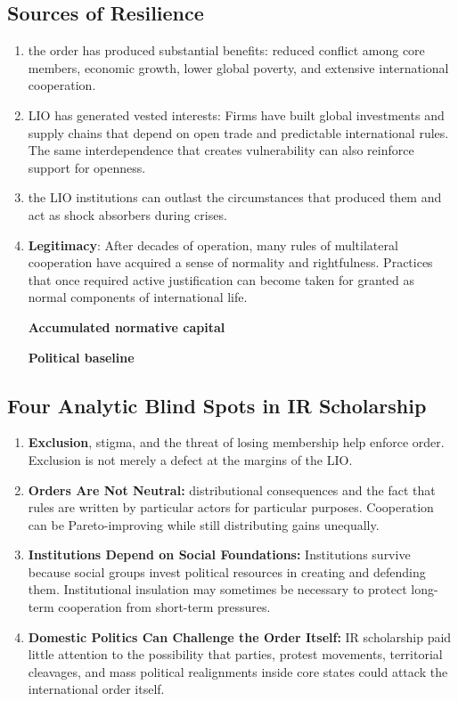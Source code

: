 \subsection{Sources of Resilience}

\begin{enumerate}
    \item the order has produced substantial benefits: reduced conflict among core members, economic growth, lower global poverty, and extensive international cooperation.
    \item LIO has generated vested interests: Firms have built global investments and supply chains that depend on open trade and predictable international rules. The same interdependence that creates vulnerability can also reinforce support for openness.
    \item the LIO institutions can outlast the circumstances that produced them and act as shock absorbers during crises.
    \item \textbf{Legitimacy}: After decades of operation, many rules of multilateral cooperation have acquired a sense of normality and rightfulness. Practices that once required active justification can become taken for granted as normal components of international life.
    
    \textbf{Accumulated normative capital}
    
    \textbf{Political baseline}
\end{enumerate}

\subsection{Four Analytic Blind Spots in IR Scholarship}

\begin{enumerate}
    \item \textbf{Exclusion}, stigma, and the threat of losing membership help enforce order. Exclusion is not merely a defect at the margins of the LIO.
    \item \textbf{Orders Are Not Neutral:} distributional consequences and the fact that rules are written by particular actors for particular purposes. Cooperation can be Pareto-improving while still distributing gains unequally.
    \item \textbf{Institutions Depend on Social Foundations:} Institutions survive because social groups invest political resources in creating and defending them. Institutional insulation may sometimes be necessary to protect long-term cooperation from short-term pressures.
    \item \textbf{Domestic Politics Can Challenge the Order Itself:} IR scholarship  paid little attention to the possibility that parties, protest movements, territorial cleavages, and mass political realignments inside core states could attack the international order itself.
\end{enumerate}

